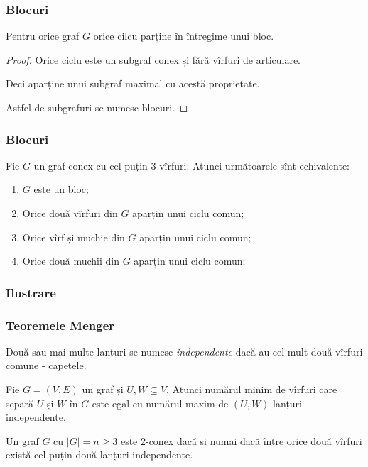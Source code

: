 \begin{frame}
  \frametitle{Blocuri}

\begin{theorem}
Pentru orice graf $G$ orice cilcu parține în întregime unui bloc. 
\end{theorem}\pause

\begin{proof}
Orice ciclu este un subgraf conex și fără vîrfuri de articulare.

Deci aparține unui subgraf maximal cu acestă proprietate.

Astfel de subgrafuri se numesc blocuri. 
\end{proof}


\end{frame}

\begin{frame}
  \frametitle{Blocuri}

\begin{theorem}
Fie $G$ un graf conex cu cel puțin 3 vîrfuri. Atunci următoarele sînt echivalente:
\begin{enumerate}
  \item $G$ este un bloc;
  \item Orice două vîrfuri din $G$ aparțin unui ciclu comun;
  \item Orice vîrf și muchie din $G$ aparțin unui ciclu comun;
  \item Orice două muchii din $G$ aparțin unui ciclu comun;
\end{enumerate}
 
\end{theorem}


\end{frame}


\begin{frame}
  \frametitle{Ilustrare}
\end{frame}


\begin{frame}
  \frametitle{Teoremele Menger}
 
Două sau mai multe lanțuri se numesc \emph{independente} dacă au cel mult două 
vîrfuri comune - capetele.\pause

\begin{theorem}[Menger 1927]\cite{diestel}
Fie $G=(V,E)$ un graf și $U,W\subseteq V$. Atunci numărul minim de vîrfuri care 
separă $U$ și $W$ în $G$ este egal cu numărul maxim de $(U,W)$-lanțuri 
independente.
\end{theorem}\pause


\begin{theorem}[Menger 1932]\cite{GTA}
Un graf $G$ cu $|G|=n\geq 3$ este 2-conex dacă și numai dacă între orice două 
vîrfuri există cel puțin două lanțuri independente.
\end{theorem}

\end{frame}

